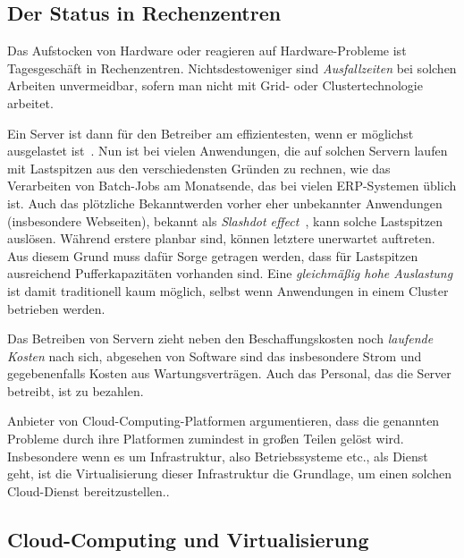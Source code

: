 
\subsection{Der Status in Rechenzentren}

Das Aufstocken von Hardware oder reagieren auf Hardware-Probleme ist
Tagesgeschäft in Rechenzentren. Nichtsdestoweniger sind
\emph{Ausfallzeiten} bei solchen Arbeiten unvermeidbar, sofern man
nicht mit Grid- oder Clustertechnologie arbeitet. 

Ein Server ist dann für den Betreiber am effizientesten, wenn er
möglichst ausgelastet ist~\cite{Schwarzer2010:Cloud-Hype-Tren}. Nun
ist bei vielen Anwendungen, die auf solchen Servern laufen mit
Lastspitzen aus den verschiedensten Gründen zu rechnen, wie das
Verarbeiten von Batch-Jobs am Monatsende, das bei vielen
\ac{ERP}-Systemen üblich ist. Auch das plötzliche Bekanntwerden vorher
eher unbekannter Anwendungen (insbesondere Webseiten), bekannt als
\emph{Slashdot effect}~\cite{halavais2001slashdot}, kann solche
Lastspitzen auslösen. Während erstere planbar sind, können letztere
unerwartet auftreten. Aus diesem Grund muss dafür Sorge getragen
werden, dass für Lastspitzen ausreichend Pufferkapazitäten vorhanden
sind. Eine \emph{gleichmäßig hohe Auslastung} ist damit traditionell
kaum möglich, selbst wenn Anwendungen in einem Cluster betrieben
werden.

Das Betreiben von Servern zieht neben den Beschaffungskosten noch
\emph{laufende Kosten} nach sich, abgesehen von Software sind das
insbesondere Strom und gegebenenfalls Kosten aus Wartungsverträgen.
Auch das Personal, das die Server betreibt, ist zu bezahlen.
\medskip

Anbieter von Cloud-Computing-Platformen argumentieren, dass die
genannten Probleme durch ihre Platformen zumindest in großen Teilen
gelöst wird\cite{heroku,engineyard,openstack}. Insbesondere wenn es um
Infrastruktur, also Betriebssysteme etc., als Dienst geht, ist die
Virtualisierung dieser Infrastruktur die Grundlage, um einen solchen
Cloud-Dienst bereitzustellen.\cite{nomadbioslivemigration-cloudseminar}.







\subsection{Cloud-Computing und Virtualisierung}
\label{sec:ziel}

